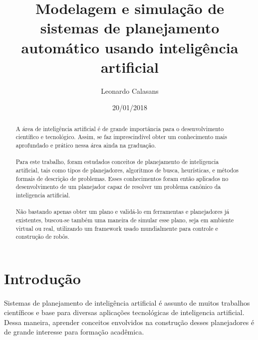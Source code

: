 \documentclass[12pt,titlepage]{article}
\title{Modelagem e simulação de sistemas de planejamento automático usando inteligência artificial}
\date{20/01/2018}
\author{Leonardo Calasans}
\begin{document}


\newpage
\doublespacing
\tableofcontents
\newpage
{}


\begin{abstract}
		\paragraph{}
		A área de inteligência artificial é de grande importância para o desenvolvimento científico e tecnológico. Assim, se faz imprescindível obter um conhecimento mais aprofundado e prático nessa área ainda na graduação.
		\paragraph{}
		Para este trabalho, foram  estudados conceitos de planejamento de inteligencia artificial, tais como tipos de planejadores, algoritmos de busca, heurísticas, e métodos formais de descrição de problemas. Esses conhecimentos foram então aplicados no desenvolvimento de um planejador capaz de resolver um problema canônico da inteligencia artificial.
		\paragraph{}
		Não bastando apenas obter um plano e validá-lo em ferramentas e planejadores já existentes, buscou-se também uma maneira de simular esse plano, seja em ambiente virtual ou real, utilizando um framework usado mundialmente para controle e construção de robôs.

\end{abstract}
\newpage

\section{Introdução}

	\paragraph{}
	Sistemas de planejamento de inteligência artificial é assunto de muitos trabalhos científicos e base para diversas aplicações tecnológicas de inteligencia artificial. Dessa maneira, aprender conceitos envolvidos na construção desses planejadores é de grande interesse para formação acadêmica.
\end{document}
